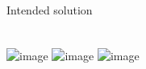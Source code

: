 \begin{frame}
\begin{block}{Intended solution}
\begin{columns}
\begin{column}{0.42\textwidth}
\begin{center}
      \end{center}
      \end{column}
      \end{columns}
    \end{block}
    \solvestats
\end{frame}

\begin{frame}
    \frametitle{\problemtitle}
    \centering
    \includegraphics<+>[height=0.8\textheight]{vis-1}%
    \includegraphics<+>[height=0.8\textheight]{vis-2}%
    \includegraphics<+>[height=0.8\textheight]{vis-3}%
\end{frame}
